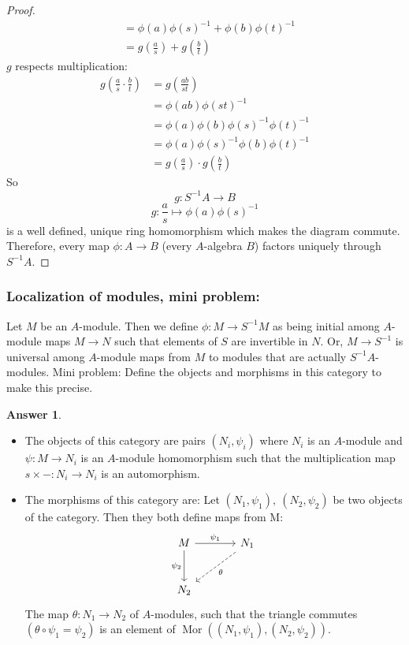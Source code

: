 \documentclass[hidelinks,12pt]{article}
\newtheorem*{answer}{Answer}
\newcommand{\mor}{\operatorname{Mor}}
\begin{document}
\begin{proof}
\begin{align*}
                                             &=\phi(a)\phi(s)^{-1}+\phi(b)\phi(t)^{-1}\\
                                             &=g\left(\frac{a}{s}\right)+g\left(\frac{b}{t}\right)
    \end{align*}
    \(g\) respects multiplication:
    \begin{align*}
        g\left(\frac{a}{s}\cdot\frac{b}{t}\right)&=g\left(\frac{ab}{st}\right)\\
                                                 &=\phi(ab)\phi(st)^{-1}\\
                                                 &=\phi(a)\phi(b)\phi(s)^{-1}\phi(t)^{-1}\\
                                                 &=\phi(a)\phi(s)^{-1}\phi(b)\phi(t)^{-1}\\
                                                 &=g\left(\frac{a}{s}\right)\cdot g\left(\frac{b}{t}\right)
    \end{align*}
    So \[
        g:S^{-1}A\to B
    \]
    \[
        g:\frac{a}{s}\mapsto\phi(a)\phi(s)^{-1}
    \]
    is a well defined, unique ring homomorphism which makes the diagram commute. Therefore, every map \(\phi:A\to B\) (every \(A\)-algebra \(B\)) factors uniquely through \(S^{-1}A\).
\end{proof}
\pagebreak
\subsubsection{Localization of modules, mini problem:}
Let \(M\) be an \(A\)-module. Then we define \(\phi:M\to S^{-1}M\) as being initial among \(A\)-module maps \(M\to N\) such that elements of \(S\) are invertible in \(N\). Or, \(M\to S^{-1}\) is universal among \(A\)-module maps from \(M\) to modules that are actually \(S^{-1}A\)-modules. Mini problem: Define the objects and morphisms in this category to make this precise.
\begin{answer}
\end{answer}
\begin{itemize}
    \item The objects of this category are pairs \((N_{i},\psi_{i})\) where \(N_{i}\) is an \(A\)-module and \(\psi:M\to N_{i}\) is an \(A\)-module homomorphism such that the multiplication map \(s\times -:N_{i}\to N_{i}\) is an automorphism.
    \item The morphisms of this category are: Let \((N_{1},\psi_{1}),\ (N_{2},\psi_{2})\) be two objects of the category. Then they both define maps from M:
        \[
            \begin{tikzcd}[row sep=large,column sep=large]
                M \arrow[r, "\psi_{1}"] \arrow[d, "\psi_{2}"'] & N_{1} \arrow[dl, "\theta",dashed] \\
                N_{2} & 
            \end{tikzcd}
        \]
        The map \(\theta:N_{1}\to N_{2}\) of \(A\)-modules, such that the triangle commutes \((\theta\circ\psi_{1}=\psi_{2})\) is an element of \(\mor((N_{1},\psi_{1}),(N_{2},\psi_{2}))\).
\end{itemize}
\end{document}
